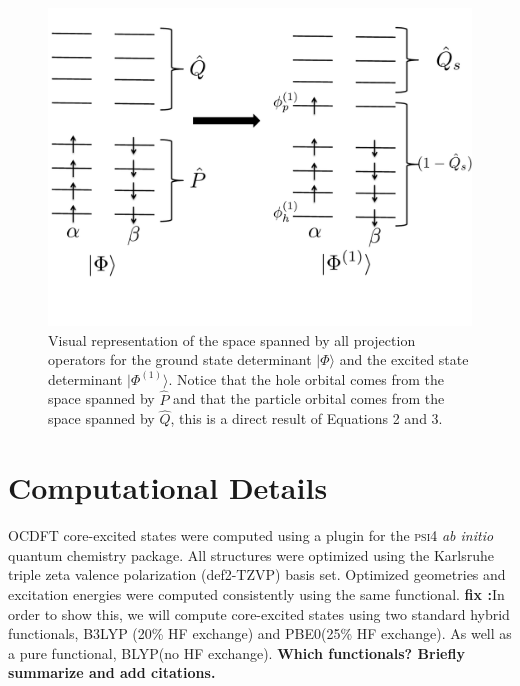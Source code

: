\documentclass[12pt]{article}
\begin{document}
\begin{figure}
\includegraphics[scale=0.35]{Figure1.pdf}
\caption{Visual representation of the space spanned by all projection operators for the ground state determinant $|\Phi\rangle$ and the excited state determinant $|\Phi^{(1)}\rangle$. Notice that the hole orbital comes from the space spanned by $\hat{P}$ and that the particle orbital comes from the space spanned by  $\hat{Q}$, this is a direct result of Equations 2 and 3.}
\label{fig:projection}
\end{figure}


\section{Computational Details}
OCDFT core-excited states were computed using a plugin for the \textsc{psi4} \textit{ab initio} quantum chemistry package.\cite{turney_psi4:_2012}
All structures were optimized using the Karlsruhe triple zeta valence polarization (def2-TZVP) basis set.\cite{weigend_balanced_2005,weigend_accurate_2006}  Optimized geometries and excitation energies were computed consistently using the same functional.
\textbf{fix :}In order to show this, we will compute core-excited states using two standard hybrid functionals, B3LYP (20\% HF exchange) and PBE0(25\% HF exchange). As well as a pure functional, BLYP(no HF exchange).
\textbf{Which functionals?  Briefly summarize and add citations.}
\end{document}
